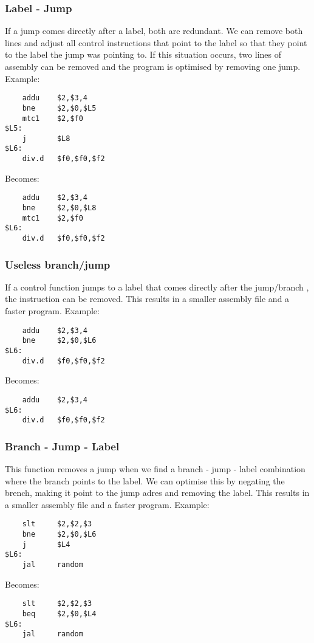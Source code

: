 \subsubsection{Label - Jump}
If a jump comes directly after a label, both are redundant. We can remove both
lines and adjust all control instructions that point to the label so that they
point to the label the jump was pointing to. If this situation occurs, two
lines of assembly can be removed and the program is optimised by removing one 
jump.
Example:
\begin{lstlisting}
    addu    $2,$3,4
    bne     $2,$0,$L5
    mtc1    $2,$f0
$L5:
    j       $L8
$L6:
    div.d   $f0,$f0,$f2	
\end{lstlisting}
Becomes:
\begin{lstlisting}
    addu    $2,$3,4
    bne     $2,$0,$L8
    mtc1    $2,$f0
$L6:
    div.d   $f0,$f0,$f2	
\end{lstlisting}
\subsubsection{Useless branch/jump}
If a control function jumps to a label that comes directly after the jump/branch
, the instruction can be removed. This results in a smaller assembly file and
a faster program.
Example:
\begin{lstlisting}
    addu    $2,$3,4
    bne     $2,$0,$L6
$L6:
    div.d   $f0,$f0,$f2	
\end{lstlisting}
Becomes:
\begin{lstlisting}
    addu    $2,$3,4
$L6:
    div.d   $f0,$f0,$f2	
\end{lstlisting}
\subsubsection{Branch - Jump - Label}
This function removes a jump when we find a branch - jump - label
combination where the branch points to the label. We can optimise this
by negating the brench, making it point to the jump adres and removing the
label. This results in a smaller assembly file and
a faster program.
Example:
\begin{lstlisting}
    slt     $2,$2,$3
    bne     $2,$0,$L6
    j       $L4
$L6:
    jal     random
\end{lstlisting}
Becomes:
\begin{lstlisting}
    slt     $2,$2,$3
    beq     $2,$0,$L4
$L6:
    jal     random
\end{lstlisting}
